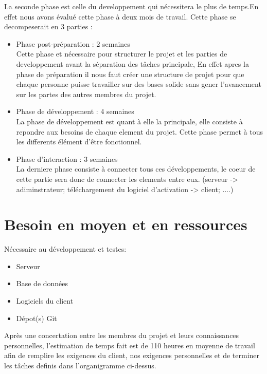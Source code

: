 La seconde phase est celle du developpement qui nécessitera le plus de temps.En effet nous avons évalué cette phase à deux mois de travail.
Cette phase se decompeserait en 3 parties : \newline

\begin{itemize}
	\item Phase post-préparation : 2 semaines\\ 
	Cette phase et nécessaire pour structurer le projet et les parties de developpement avant la séparation des tâches principale, En effet apres la phase de préparation 
	il nous faut créer une structure de projet pour que chaque personne puisse travailler sur des bases solide sans gener l'avancement sur les partes des 
	autres membres du projet. \newline
	\item Phase de développement : 4 semaines\\
	La phase de développement est quant à elle la principale, elle consiste à repondre aux besoins de chaque element du projet. Cette phase permet 
	à tous les differents élément d'être fonctionnel.
	\item Phase d'interaction : 3 semaines\\
	La derniere phase consiste à connecter tous ces développements, le coeur de cette partie sera donc de connecter les elements entre eux. (serveur -> adiminstrateur; téléchargement du logiciel d'activation -> client; ....)
\end{itemize}
\newpage
\section{Besoin en moyen et en ressources}
Nécessaire au développement et testes:
\begin{itemize}
	\item Serveur
	\item Base de données
	\item Logiciels du client
	\item Dépot(s) Git \\ \newline
\end{itemize}
Après une concertation entre les membres du projet et leurs connaissances personnelles, l'estimation de temps fait est de
  110 heures en moyenne de travail afin de remplire les exigences du client, nos exigences personnelles et de terminer les tâches definis
	dans l'organigramme ci-dessus.\\ \newline

